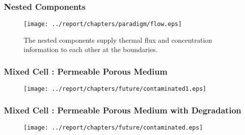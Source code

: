 

\begin{frame}[ctb!]
  \frametitle{Nested Components}
  \begin{figure}[h!]
    \begin{center}
      \texttt{[image: ../report/chapters/paradigm/flow.eps]}
    \end{center}
    \caption{The nested components supply thermal flux and concentration 
    information to each other at the boundaries.}
    \label{fig:flow}
  \end{figure}
\end{frame}



\begin{frame}[ctb!]
  \frametitle{Mixed Cell : Permeable Porous Medium}
  \begin{figure}[h!]
    \begin{center}
      \texttt{[image: ../report/chapters/future/contaminated1.eps]}
    \end{center}
  \end{figure}
\end{frame}

\begin{frame}[ctb!]
  \frametitle{Mixed Cell : Permeable Porous Medium with Degradation}
  \begin{figure}[h!]
    \begin{center}
      \texttt{[image: ../report/chapters/future/contaminated.eps]}
    \end{center}
  \end{figure}
\end{frame}

